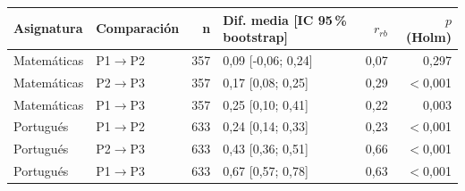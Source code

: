 \begin{tabular}{llrlrr}
\toprule
Asignatura & Comparación & n & Dif. media [IC 95\,\% bootstrap] & $r_{rb}$ & $p$ (Holm) \\
\midrule
Matemáticas & P1$\rightarrow$P2 & 357 & 0,09 [-0,06; 0,24] & 0,07 & 0,297 \\
Matemáticas & P2$\rightarrow$P3 & 357 & 0,17 [0,08; 0,25] & 0,29 & $<$0,001 \\
Matemáticas & P1$\rightarrow$P3 & 357 & 0,25 [0,10; 0,41] & 0,22 & 0,003 \\
Portugués & P1$\rightarrow$P2 & 633 & 0,24 [0,14; 0,33] & 0,23 & $<$0,001 \\
Portugués & P2$\rightarrow$P3 & 633 & 0,43 [0,36; 0,51] & 0,66 & $<$0,001 \\
Portugués & P1$\rightarrow$P3 & 633 & 0,67 [0,57; 0,78] & 0,63 & $<$0,001 \\
\bottomrule
\end{tabular}
